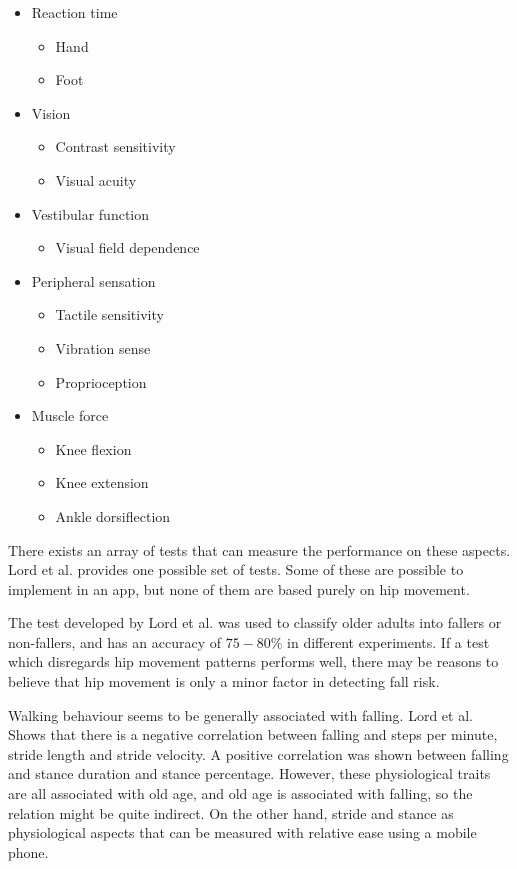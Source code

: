 \begin{itemize}
\item Reaction time
\begin{itemize}
\item Hand
\item Foot
\end{itemize}
\item Vision
\begin{itemize}
\item Contrast sensitivity
\item Visual acuity
\end{itemize}
\item Vestibular function
\begin{itemize}
\item Visual field dependence
\end{itemize}
\item 
Peripheral sensation
\begin{itemize}
\item Tactile sensitivity
\item Vibration sense
\item Proprioception
\end{itemize}
\item Muscle force
\begin{itemize}
\item Knee flexion
\item Knee extension
\item Ankle dorsiflection
\end{itemize}
\end{itemize}


There exists an array of tests that can measure the performance on these aspects. Lord et al. provides one possible set of tests\cite{LMTassessPrev}. Some of these are possible to implement in an app, but none of them are based purely on hip movement.

The test developed by Lord et al. was used to classify older adults into fallers or non-fallers, and has an accuracy of $75-80\%$ in different experiments\cite{LMTassessPrev}. If a test which disregards hip movement patterns performs well, there may be reasons to believe that hip movement is only a minor factor in detecting fall risk.  

Walking behaviour seems to be generally associated with falling. Lord et al. Shows that there is a negative correlation between falling and steps per minute, stride length and stride velocity. A positive correlation was shown between falling and stance duration and stance percentage. However, these physiological traits are all associated with old age, and old age is associated with falling, so the relation might be quite indirect. On the other hand, stride and stance as physiological aspects that can be measured with relative ease using a mobile phone.\cite{LLKgaitPatterns}